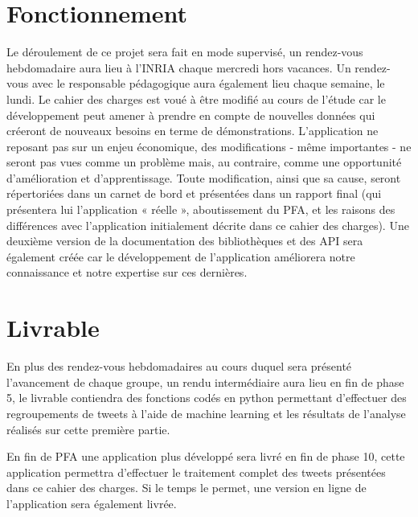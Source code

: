 \documentclass{article}
\begin{document}
\section{Fonctionnement}


Le déroulement de ce projet sera fait en mode supervisé, un rendez-vous hebdomadaire aura lieu à l’INRIA chaque mercredi hors vacances. 
Un rendez-vous avec le responsable pédagogique aura également lieu chaque semaine, le lundi.
Le cahier des charges est voué à être modifié au cours de l’étude car le développement peut amener à prendre en compte de nouvelles données qui créeront de nouveaux besoins en terme de démonstrations. 
L’application ne reposant pas sur un enjeu économique, des modifications - même importantes - ne seront pas vues comme un problème mais, au contraire, comme une opportunité d’amélioration et d’apprentissage.
Toute modification, ainsi que sa cause, seront répertoriées dans un carnet de bord et présentées dans un rapport final (qui présentera lui l’application « réelle », aboutissement du PFA, et les raisons des différences avec l’application initialement décrite dans ce cahier des charges). 
Une deuxième version de la documentation des bibliothèques et des API sera également créée car le développement de l’application améliorera notre connaissance et notre expertise sur ces dernières.

\section{Livrable}

En plus des rendez-vous hebdomadaires au cours duquel sera présenté l'avancement de chaque groupe, un rendu intermédiaire aura lieu en fin de phase 5, le livrable contiendra des fonctions codés en python permettant d'effectuer des regroupements de tweets à l'aide de machine learning et les résultats de l'analyse réalisés sur cette première partie.

En fin de PFA une application plus développé sera livré en fin de phase 10, cette application permettra d'effectuer le traitement complet des tweets présentées dans ce cahier des charges. Si le temps le permet, une version en ligne de l'application sera également livrée.
\end{document}
